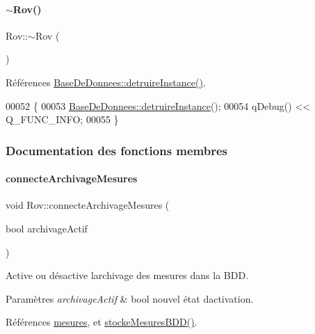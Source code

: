\paragraph{\texorpdfstring{$\sim$\+Rov()}{~Rov()}}
{\footnotesize\ttfamily Rov\+::$\sim$\+Rov (\begin{DoxyParamCaption}{ }\end{DoxyParamCaption})}



Références \hyperlink{class_base_de_donnees_a457401c0816b888c77ce915997545f4e}{Base\+De\+Donnees\+::detruire\+Instance()}.


\begin{DoxyCode}
00052 \{
00053     \hyperlink{class_base_de_donnees_a457401c0816b888c77ce915997545f4e}{BaseDeDonnees::detruireInstance}();
00054     qDebug() << Q\_FUNC\_INFO;
00055 \}
\end{DoxyCode}


\subsubsection{Documentation des fonctions membres}
\mbox{\label{class_rov_a738965ca84678b506b3d6a326c48e9e3}} 
\paragraph{\texorpdfstring{connecte\+Archivage\+Mesures}{connecteArchivageMesures}}
{\footnotesize\ttfamily void Rov\+::connecte\+Archivage\+Mesures (\begin{DoxyParamCaption}\item[{bool}]{archivage\+Actif }\end{DoxyParamCaption})\hspace{0.3cm}{\ttfamily [slot]}}

Active ou désactive l\textquotesingle{}archivage des mesures dans la B\+DD.


\begin{DoxyParams}{Paramètres}
{\em archivage\+Actif} & bool nouvel état d\textquotesingle{}activation. \\
\hline
\end{DoxyParams}


Références \hyperlink{class_rov_af37589b38493e4bd99702587db2d28a8}{mesures}, et \hyperlink{class_rov_adab08abfde381c2915695489b34da6b4}{stocke\+Mesures\+B\+D\+D()}.




